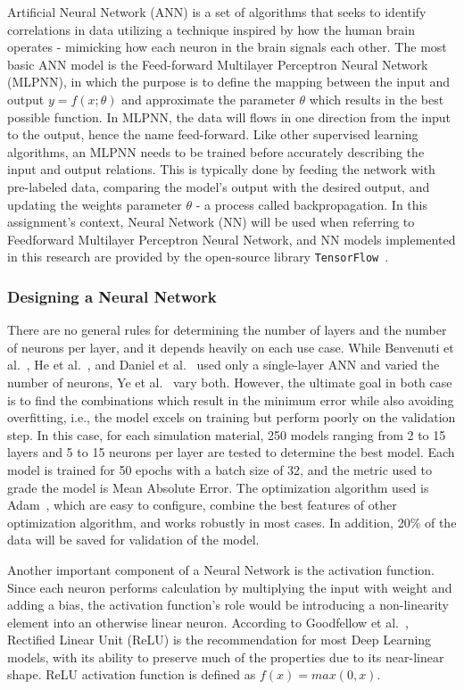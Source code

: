 Artificial Neural Network (ANN) is a set of algorithms that seeks to identify correlations in data utilizing a technique inspired by how the human brain operates - mimicking how each neuron in the brain signals each other. The most basic ANN model is the Feed-forward Multilayer Perceptron Neural Network (MLPNN), in which the purpose is to define the mapping between the input and output \(y = f(x;\theta)\) and approximate the parameter \(\theta\) which results in the best possible function. In MLPNN, the data will flows in one direction from the input to the output, hence the name feed-forward. Like other supervised learning algorithms, an MLPNN needs to be trained before accurately describing the input and output relations. This is typically done by feeding the network with pre-labeled data, comparing the model's output with the desired output, and updating the weights parameter \(\theta\) - a process called backpropagation. In this assignment's context, Neural Network (NN) will be used when referring to Feedforward Multilayer Perceptron Neural Network, and NN models implemented in this research are provided by the open-source library \texttt{TensorFlow}~\cite{tensorflow2015-whitepaper}.

\subsubsection{Designing a Neural Network}

There are no general rules for determining the number of layers and the number of neurons per layer, and it depends heavily on each use case. While Benvenuti et al.~\cite{nn-calibration}, He et al.~\cite{NN-GA}, and Daniel et al.~\cite{NN-coarse} used only a single-layer ANN and varied the number of neurons, Ye et al.~\cite{YE2019292} vary both. However, the ultimate goal in both case is to find the combinations which result in the minimum error while also avoiding overfitting, i.e., the model excels on training but perform poorly on the validation step. In this case, for each simulation material, 250 models ranging from 2 to 15 layers and 5 to 15 neurons per layer are tested to determine the best model. Each model is trained for 50 epochs with a batch size of 32, and the metric used to grade the model is Mean Absolute Error. The optimization algorithm used is Adam~\cite{adam}, which are easy to configure, combine the best features of other optimization algorithm, and works robustly in most cases. In addition, 20\% of the data will be saved for validation of the model. 

Another important component of a Neural Network is the activation function. Since each neuron performs calculation by multiplying the input with weight and adding a bias, the activation function's role would be introducing a non-linearity element into an otherwise linear neuron. According to Goodfellow et al.~\cite{DL-Goodfellow}, Rectified Linear Unit (ReLU) is the recommendation for most Deep Learning models, with its ability to preserve much of the properties due to its near-linear shape. ReLU activation function is defined as $f(x) = max(0, x)$. 

